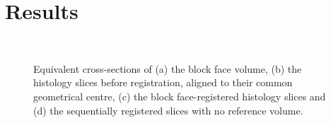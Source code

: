 \section{Results} %
\label{sec:results}
  \begin{figure}[!t]
    \centering
    \\
    \caption{Equivalent cross-sections of (a) the block face volume, (b) the histology slices before registration, aligned to their common geometrical centre, (c) the block face-registered histology slices and (d) the sequentially registered slices with no reference volume.}
    \label{fig:block_face_registration}
  \end{figure}
  
